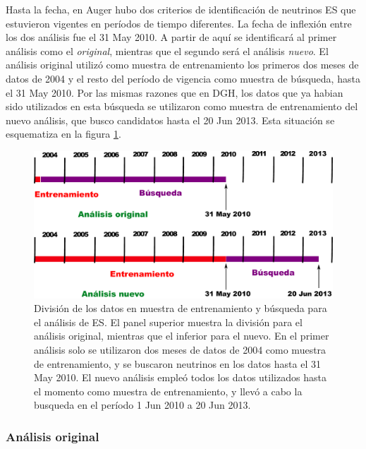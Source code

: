 	Hasta la fecha, en Auger hubo dos criterios de identificación de neutrinos ES que estuvieron vigentes en períodos de tiempo diferentes. 
	La fecha de inflexión entre los dos análisis fue el 31 May 2010.
	A partir de aquí se identificará al primer análisis como el \emph{original}, mientras que el segundo será el análisis \emph{nuevo}.
	El análisis original utilizó como muestra de entrenamiento los primeros dos meses de datos de 2004 y el resto del período de vigencia como muestra de búsqueda, hasta el 31 May 2010.
	Por las mismas razones que en DGH, los datos que ya habian sido utilizados en esta búsqueda se utilizaron como muestra de entrenamiento del nuevo análisis, que busco candidatos hasta el 20 Jun 2013.
	Esta situación se esquematiza en la figura \ref{fig:periodosES}.
	\begin{figure}[ht]
	\begin{center}
	\includegraphics[width=\textwidth]{fig/seleccionAuger/periodosES}
	\caption{División de los datos en muestra de entrenamiento y búsqueda para el análisis de ES.
	El panel superior muestra la división para el análisis original, mientras que el inferior para el nuevo.
	En el primer análisis solo se utilizaron dos meses de datos de 2004 como muestra de entrenamiento, y se buscaron neutrinos en los datos hasta el 31 May 2010.
	El nuevo análisis empleó todos los datos utilizados hasta el momento como muestra de entrenamiento, y llevó a cabo la busqueda en el período 1 Jun 2010 a 20 Jun 2013.}
	\label{fig:periodosES}
	\end{center}
	\end{figure}
	
	\subsubsection{Análisis original}
	
